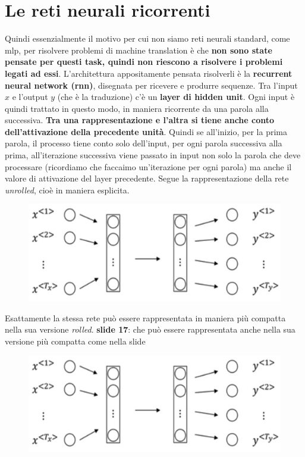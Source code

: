 \section{Le reti neurali ricorrenti}
Quindi essenzialmente il motivo per cui non siamo reti neurali standard, come mlp, per risolvere
problemi di machine translation è che \textbf{non sono state pensate per questi task, quindi non
riescono a risolvere i problemi legati ad essi}. L'architettura appositamente pensata risolverli è la
\textbf{recurrent neural network (rnn)}, disegnata per ricevere e produrre sequenze. Tra l'input 
$x$ e l'output $y$ (che è la traduzione) c'è un \textbf{layer di hidden unit}. 
Ogni input è quindi trattato in questo modo, in maniera ricorrente da una parola alla successiva. 
\textbf{Tra una rappresentazione e l'altra si tiene anche conto dell'attivazione della precedente unità}. 
Quindi se all'inizio, per la prima parola, il processo tiene conto solo dell'input, per ogni parola successiva
alla prima, all'iterazione successiva viene passato in input non solo la parola che deve processare (ricordiamo
che faccaimo un'iterazione per ogni parola) ma anche il valore di attivazione del layer precedente. Segue
la rappresentazione della rete \textit{unrolled}, cioè in maniera esplicita.
\begin{figure}[!h]
   \includegraphics[scale=.5]{images/rnn/mlp.png}
   \centering
\end{figure}


Esattamente la stessa rete può essere rappresentata in maniera più compatta nella sua versione \textit{rolled}.
\textbf{slide 17}: che può essere rappresentata anche nella sua versione più compatta come nella slide
\begin{figure}[!h]
   \includegraphics[scale=.5]{images/rnn/mlp.png}
   \centering
\end{figure}


